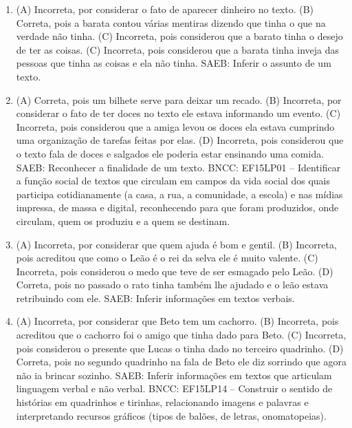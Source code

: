 \begin{enumerate}
\item
(A) Incorreta, por considerar o fato de aparecer dinheiro no texto.
(B) Correta, pois a barata contou várias mentiras dizendo que tinha o
que na verdade não tinha.
(C) Incorreta, pois considerou que a barato tinha o desejo de ter as
coisas.
(C) Incorreta, pois considerou que a barata tinha inveja das pessoas que
tinha as coisas e ela não tinha.
SAEB: Inferir o assunto de um texto.

\item
(A) Correta, pois um bilhete serve para deixar um recado.
(B) Incorreta, por considerar o fato de ter doces no texto ele estava
informando um evento.
(C) Incorreta, pois considerou que a amiga levou os doces ela estava
cumprindo uma organização de tarefas feitas por elas.
(D) Incorreta, pois considerou que o texto fala de doces e salgados ele
poderia estar ensinando uma
comida.
SAEB: Reconhecer a finalidade de um texto.
BNCC: EF15LP01 -- Identificar a função social de textos que
circulam em campos da vida social dos quais participa cotidianamente (a
casa, a rua, a comunidade, a escola) e nas mídias impressa, de massa e
digital, reconhecendo para que foram produzidos, onde circulam, quem os
produziu e a quem se destinam.

\item
(A) Incorreta, por considerar que quem ajuda é bom e gentil.
(B) Incorreta, pois acreditou que como o Leão é o rei da selva ele é
muito valente.
(C) Incorreta, pois considerou o medo que teve de ser esmagado pelo
Leão.
(D) Correta, pois no passado o rato tinha também lhe ajudado e o leão
estava retribuindo com ele.
SAEB: Inferir informações em textos verbais.

\item
(A) Incorreta, por considerar que Beto tem um cachorro.
(B) Incorreta, pois acreditou que o cachorro foi o amigo que tinha dado
para Beto.
(C) Incorreta, pois considerou o presente que Lucas o tinha dado no
terceiro quadrinho.
(D) Correta, pois no segundo quadrinho na fala de Beto ele diz sorrindo
que agora não ia brincar sozinho.
SAEB: Inferir informações em textos que articulam linguagem
verbal e não verbal.
BNCC: EF15LP14 -- Construir o sentido de histórias em
quadrinhos e tirinhas, relacionando imagens e palavras e interpretando
recursos gráficos (tipos de balões, de letras, onomatopeias).
\end{enumerate}



